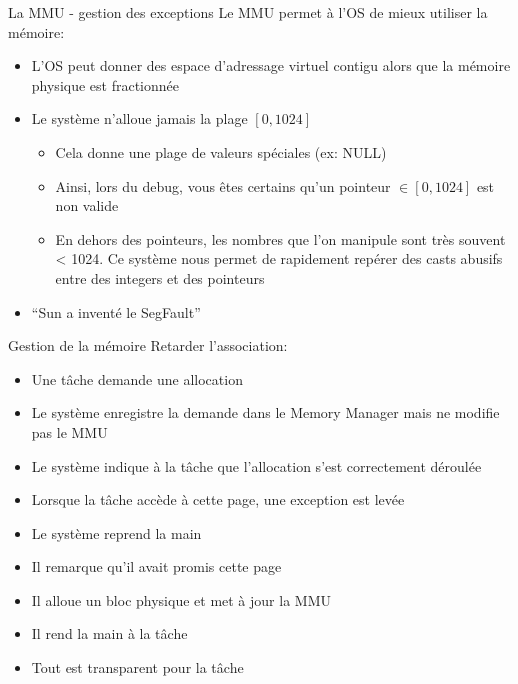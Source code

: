 \begin{frame}{La MMU - gestion des exceptions}
  Le MMU permet à l'OS de mieux utiliser la mémoire:
  \begin{itemize} 
  \item  L'OS peut  donner  des espace  d'adressage virtuel  contigu
    alors que la mémoire physique est fractionnée
  \item Le système n'alloue jamais la plage $[0, 1024]$
    \begin{itemize}
    \item Cela donne une plage de valeurs spéciales (ex: NULL)
    \item Ainsi, lors du debug, vous êtes certains qu'un pointeur $\in
      [0, 1024]$ est non valide
    \item En dehors des pointeurs,  les nombres que l'on manipule sont
      très  souvent <  1024.   Ce système  nous  permet de  rapidement
      repérer des casts abusifs entre des integers et des pointeurs
    \end{itemize} 
  \item ``Sun a inventé le SegFault''
  \end{itemize} 
\end{frame}

\begin{frame}{Gestion de la mémoire}
  Retarder l'association:
  \begin{itemize}
  \item Une tâche demande une allocation
  \item Le système  enregistre la demande dans le  Memory Manager mais
    ne modifie pas le MMU
  \item  Le  système  indique   à  la  tâche  que  l'allocation  s'est
    correctement déroulée
  \item Lorsque la tâche accède à cette page, une exception est levée
  \item Le système reprend la main
  \item Il remarque qu'il avait promis cette page
  \item Il alloue un bloc physique et met à jour la MMU
  \item Il rend la main à la tâche
  \item Tout est transparent pour la tâche
  \end{itemize}
\end{frame}


